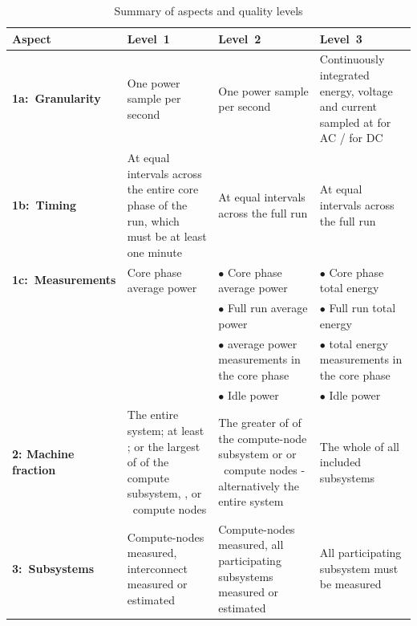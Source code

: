 \noindent
\begin{table}
\caption{Summary of aspects and quality levels}
\label{tab:levels}
\begin{tabular}{|p{3.0cm}|p{3.5cm}|p{3.5cm}|p{3.5cm}|} \hline
\textbf{Aspect}&\textbf{Level~1}&\textbf{Level~2}&\textbf{Level~3}\\ \hline

\textbf{1a:~Granularity} &
One power sample per second &
One power sample per second &
Continuously integrated energy, voltage and current sampled at \SpecRateLThreeAC{} for AC / \SpecRateLThreeDC{} for DC \\
\hline


\textbf{1b:~Timing} &
At equal intervals across the entire core phase of the run, which must be at least one minute &
At equal intervals across the full run &
At equal intervals across the full run   \\
\hline

\textbf{1c:~Measurements} &
Core phase average power &
$\bullet$ Core phase average power & 
$\bullet$ Core phase total energy \\ %

 & &
$\bullet$ Full run average power &
$\bullet$ Full run total energy \\

 & &
$\bullet$ \MinMeasurementsCorePhaseLTwoThree{} average power measurements in the core phase &
$\bullet$ \MinMeasurementsCorePhaseLTwoThree{} total energy measurements in the core phase \\

 & &
$\bullet$ Idle power &
$\bullet$ Idle power \\
\hline

\textbf{2: Machine \newline fraction}  &
The entire system; at least \SpecPowerMaxLOne{}; or the largest of \SpecFracMinLOne{} of the compute subsystem, \SpecPowerMinLOne{}, or \SpecMinNodes{}~compute nodes &
The greater of \SpecFracMinLTwo{} of the compute-node subsystem or \SpecPowerMinLTwo{} or \SpecMinNodes{}~compute nodes - alternatively the entire system &
The whole of all included subsystems \\
\hline

\textbf{3:~Subsystems} &
Compute-nodes measured, interconnect measured or estimated &
Compute-nodes measured, all participating subsystems measured or estimated &
All participating subsystem must be measured \\
\hline


\end{tabular}
\end{table}
